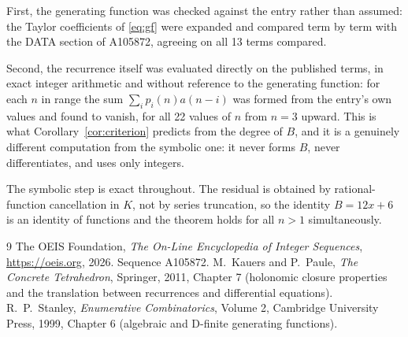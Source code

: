\documentclass[11pt,a4paper]{article}
\theoremstyle{plain}
\theoremstyle{definition}
\begin{document}
First, the generating function was checked against the entry rather than assumed: the
Taylor coefficients of \eqref{eq:gf} were expanded and compared term by term with the DATA
section of A105872, agreeing on all 13 terms compared.

Second, the recurrence itself was evaluated directly on the published terms, in exact
integer arithmetic and without reference to the generating function: for each $n$ in range
the sum $\sum_{i}p_{i}(n)a(n-i)$ was formed from the entry's own values and found to
vanish, for all 22 values of $n$ from $n=3$ upward. This is what
Corollary~\ref{cor:criterion} predicts from the degree of $B$, and it is a genuinely
different computation from the symbolic one: it never forms $B$, never differentiates, and
uses only integers.

The symbolic step is exact throughout. The residual is obtained by rational-function
cancellation in $K$, not by series truncation, so the identity $B=12 x + 6$ is an
identity of functions and the theorem holds for all $n>1$ simultaneously.

\begin{thebibliography}{9}
 The OEIS Foundation, \emph{The On-Line Encyclopedia of Integer Sequences},
\url{https://oeis.org}, 2026. Sequence A105872.
 M.~Kauers and P.~Paule, \emph{The Concrete Tetrahedron}, Springer, 2011,
Chapter 7 (holonomic closure properties and the translation between recurrences and
differential equations).
 R.~P.~Stanley, \emph{Enumerative Combinatorics}, Volume 2, Cambridge
University Press, 1999, Chapter 6 (algebraic and D-finite generating functions).
\end{thebibliography}
\end{document}
